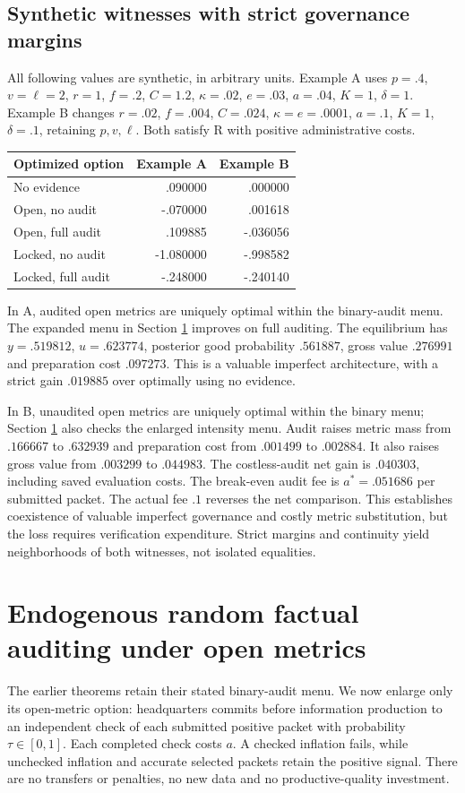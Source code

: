 \documentclass[11pt]{article}
\begin{document}
\subsection{Synthetic witnesses with strict governance margins}\label{subsec:witnesses}
All following values are synthetic, in arbitrary units. Example A uses $p=.4$, $v=\ell=2$, $r=1$, $f=.2$, $C=1.2$, $\kappa=.02$, $e=.03$, $a=.04$, $K=1$, $\delta=1$. Example B changes $r=.02$, $f=.004$, $C=.024$, $\kappa=e=.0001$, $a=.1$, $K=1$, $\delta=.1$, retaining $p,v,\ell$. Both satisfy R with positive administrative costs.
\begin{center}\small
\begin{tabular}{lrr}\toprule
Optimized option & Example A & Example B\\\midrule
No evidence & .090000 & .000000\\
Open, no audit & -.070000 & .001618\\
Open, full audit & .109885 & -.036056\\
Locked, no audit & -1.080000 & -.998582\\
Locked, full audit & -.248000 & -.240140\\\bottomrule
\end{tabular}\end{center}
In A, audited open metrics are uniquely optimal within the binary-audit menu. The expanded menu in Section \ref{sec:random} improves on full auditing. The equilibrium has $y=.519812$, $u=.623774$, posterior good probability $.561887$, gross value $.276991$ and preparation cost $.097273$. This is a valuable imperfect architecture, with a strict gain $.019885$ over optimally using no evidence.

In B, unaudited open metrics are uniquely optimal within the binary menu; Section \ref{sec:random} also checks the enlarged intensity menu. Audit raises metric mass from $.166667$ to $.632939$ and preparation cost from $.001499$ to $.002884$. It also raises gross value from $.003299$ to $.044983$. The costless-audit net gain is $.040303$, including saved evaluation costs. The break-even audit fee is $a^*=.051686$ per submitted packet. The actual fee $.1$ reverses the net comparison. This establishes coexistence of valuable imperfect governance and costly metric substitution, but the loss requires verification expenditure. Strict margins and continuity yield neighborhoods of both witnesses, not isolated equalities.

\section{Endogenous random factual auditing under open metrics}\label{sec:random}
The earlier theorems retain their stated binary-audit menu. We now enlarge only its open-metric option: headquarters commits before information production to an independent check of each submitted positive packet with probability $\tau\in[0,1]$. Each completed check costs $a$. A checked inflation fails, while unchecked inflation and accurate selected packets retain the positive signal. There are no transfers or penalties, no new data and no productive-quality investment.
\end{document}
